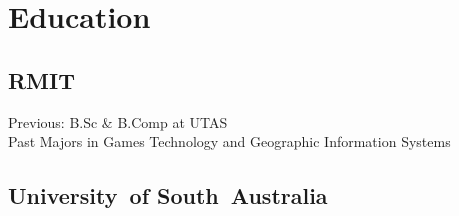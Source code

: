 \documentclass[a4paper]{deedy-resume} %
\begin{document}

\lastupdated %



\begin{minipage}[t]{0.33\textwidth} %


\section{Education}

\subsection{RMIT}

Previous: B.Sc \& B.Comp at UTAS\\
Past Majors in Games Technology and Geographic Information Systems \\

\sectionspace %

\subsection{University\hbox{ }of South~Australia}


\end{minipage}
\end{document}
